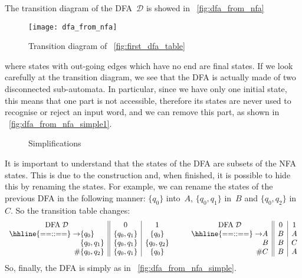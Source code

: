 The transition diagram of the DFA~\(\mathcal{D}\) is showed in
\fig~\vref{fig:dfa_from_nfa}
\begin{figure}[b]
\centering
\texttt{[image: dfa\_from\_nfa]}
\caption{Transition diagram of \fig~\vref{fig:first_dfa_table}
\label{fig:dfa_from_nfa}}
\end{figure}
where states with out-going edges which have no end are final
states. If we look carefully at the transition diagram, we see that
the DFA is actually made of two disconnected sub\hyp{}automata. In
particular, since we have only one initial state, this means that one
part is not accessible, therefore its states are never used to
recognise or reject an input word, and we can remove this part, as
shown in \fig~\ref{fig:dfa_from_nfa_simple1}.
\begin{figure}
\centering
{}
\qquad
{}
\caption{Simplifications}
\end{figure}
It is important to understand that the states of the DFA are subsets
of the NFA states. This is due to the construction and, when finished,
it is possible to hide this by renaming the states. For example, we
can rename the states of the previous DFA in the following manner:
\(\{q_0\}\) into~\(A\), \(\{q_0, q_1\}\) in~\(B\) and \(\{q_0, q_2\}\)
in~\(C\). So the transition table changes:
\begin{equation*}
  \begin{array}{r@{}l||c|c}
    \multicolumn{2}{c||}{\text{DFA} \; \mathcal{D}} & 0 & 1\\
    \hhline{==::==}
    \rightarrow & \{q_0\}     & \{q_0, q_1\} & \{q_0\}\\
                & \{q_0,q_1\} & \{q_0,q_1\}  & \{q_0,q_2\}\\
             \# & \{q_0,q_2\} & \{q_0,q_1\}  & \{q_0\}
  \end{array}
\qquad
  \begin{array}{r@{}l||c|c}
    \multicolumn{2}{c||}{\text{DFA} \; \mathcal{D}} & 0 & 1\\
    \hhline{==::==}
    \rightarrow & A & B & A\\
                & B & B & C\\
             \# & C & B & A
  \end{array}
\end{equation*}
So, finally, the DFA is simply as in \fig~\vref{fig:dfa_from_nfa_simple}.

